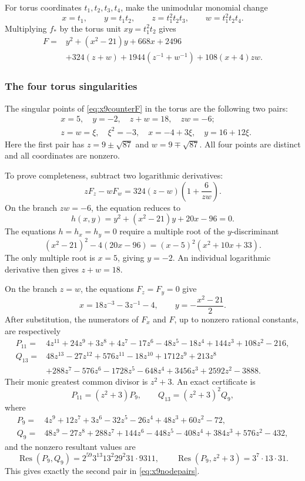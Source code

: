 For torus coordinates $t_1,t_2,t_3,t_4$, make the unimodular monomial
change
\begin{equation}\label{eq:x9coordinates}
 x=t_1,\qquad y=t_1t_2,\qquad
 z=t_1^2t_2t_3,\qquad w=t_1^2t_2t_4.
\end{equation}
Multiplying $f_*$ by the torus unit $xy=t_1^2t_2$ gives
\begin{equation}\label{eq:x9counterF}
\begin{split}
 F={}&y^2+(x^2-21)y+668x+2496\\
 &+324(z+w)+1944(z^{-1}+w^{-1})+108(x+4)zw.
\end{split}
\end{equation}

\subsubsection*{The four torus singularities}

The singular points of \eqref{eq:x9counterF} in the torus are the
following two pairs:
\begin{equation}\label{eq:x9nodepairs}
\begin{aligned}
 &x=5,\quad y=-2,\quad z+w=18,\quad zw=-6;\\
 &z=w=\xi,\quad \xi^2=-3,\quad
   x=-4+3\xi,\quad y=16+12\xi.
\end{aligned}
\end{equation}
Here the first pair has $z=9\pm\sqrt{87}$ and $w=9\mp\sqrt{87}$.
All four points are distinct and all coordinates are nonzero.

To prove completeness, subtract two logarithmic derivatives:
\[
 zF_z-wF_w=324(z-w)\left(1+\frac6{zw}\right).
\]
On the branch $zw=-6$, the equation reduces to
\[
 h(x,y)=y^2+(x^2-21)y+20x-96=0.
\]
The equations $h=h_x=h_y=0$ require a multiple root of the
$y$-discriminant
\[
 (x^2-21)^2-4(20x-96)=(x-5)^2(x^2+10x+33).
\]
The only multiple root is $x=5$, giving $y=-2$.
An individual logarithmic derivative then gives $z+w=18$.

On the branch $z=w$, the equations $F_z=F_y=0$ give
\[
 x=18z^{-3}-3z^{-1}-4,\qquad y=-\frac{x^2-21}{2}.
\]
After substitution, the numerators of $F_x$ and $F$, up to nonzero
rational constants, are respectively
\begin{align*}
 P_{11}={}&4z^{11}+24z^9+3z^8+4z^7-17z^6-48z^5-18z^4
            +144z^3+108z^2-216,\\
 Q_{13}={}&48z^{13}-27z^{12}+576z^{11}-18z^{10}+1712z^9+213z^8\\
          &+288z^7-576z^6-1728z^5-648z^4+3456z^3+2592z^2-3888.
\end{align*}
Their monic greatest common divisor is $z^2+3$. An exact certificate is
\[
 P_{11}=(z^2+3)P_9,\qquad Q_{13}=(z^2+3)^2Q_9,
\]
where
\begin{align*}
 P_9={}&4z^9+12z^7+3z^6-32z^5-26z^4+48z^3+60z^2-72,\\
 Q_9={}&48z^9-27z^8+288z^7+144z^6-448z^5-408z^4
          +384z^3+576z^2-432,
\end{align*}
and the nonzero resultant values are
\[
 \operatorname{Res}(P_9,Q_9)=2^{59}3^{13}13^2 29^2 31\cdot9311,
 \qquad \operatorname{Res}(P_9,z^2+3)=3^7\cdot13\cdot31.
\]
This gives exactly the second pair in \eqref{eq:x9nodepairs}.

